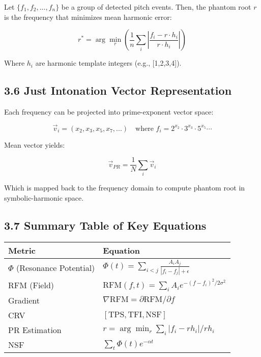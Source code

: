 Let $\{f_1, f_2, ..., f_n\}$ be a group of detected pitch events. Then, the phantom root $r$ is the frequency that minimizes mean harmonic error:

\begin{equation}
r^* = \arg\min_r \left( \frac{1}{n} \sum_i \left| \frac{f_i - r \cdot h_i}{r \cdot h_i} \right| \right)
\end{equation}

Where $h_i$ are harmonic template integers (e.g., [1,2,3,4]).

\subsection*{3.6 Just Intonation Vector Representation}

Each frequency can be projected into prime-exponent vector space:

\begin{equation}
\vec{v}_i = (x_2, x_3, x_5, x_7, ...)
\quad \text{where } f_i = 2^{x_2} \cdot 3^{x_3} \cdot 5^{x_5} \cdots
\end{equation}

Mean vector yields:

\begin{equation}
\vec{v}_{PR} = \frac{1}{N} \sum_i \vec{v}_i
\end{equation}

Which is mapped back to the frequency domain to compute phantom root in symbolic-harmonic space.

\subsection*{3.7 Summary Table of Key Equations}

\begin{center}
\begin{tabular}{|l|p{9cm}|}
\hline
\textbf{Metric} & \textbf{Equation} \\\hline
$\Phi$ (Resonance Potential) & $\Phi(t) = \sum_{i<j} \frac{A_i A_j}{|f_i - f_j| + \epsilon}$ \\\hline
RFM (Field) & $\text{RFM}(f, t) = \sum_i A_i e^{-(f - f_i)^2 / 2\sigma^2}$ \\\hline
Gradient & $\nabla \text{RFM} = \partial \text{RFM} / \partial f$ \\\hline
CRV & $[\text{TPS}, \text{TFI}, \text{NSF}]$ \\\hline
PR Estimation & $r = \arg\min_r \sum_i |f_i - r h_i| / r h_i$ \\\hline
NSF & $\sum_t \Phi(t) e^{-\alpha t}$ \\\hline
\end{tabular}
\end{center}

